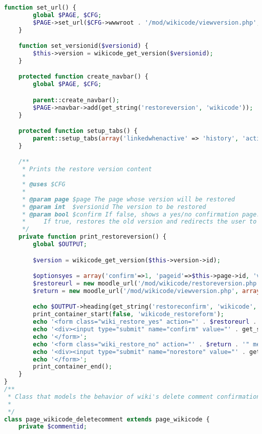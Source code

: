 \begin{lstlisting}[language=PHP]
    function set_url() {
        global $PAGE, $CFG;
        $PAGE->set_url($CFG->wwwroot . '/mod/wikicode/viewversion.php', array('pageid' => $this->page->id, 'versionid' => $this->version->id));
    }

    function set_versionid($versionid) {
        $this->version = wikicode_get_version($versionid);
    }

    protected function create_navbar() {
        global $PAGE, $CFG;

        parent::create_navbar();
        $PAGE->navbar->add(get_string('restoreversion', 'wikicode'));
    }

    protected function setup_tabs() {
        parent::setup_tabs(array('linkedwhenactive' => 'history', 'activetab' => 'history'));
    }

    /**
     * Prints the restore version content
     *
     * @uses $CFG
     *
     * @param page $page The page whose version will be restored
     * @param int  $versionid The version to be restored
     * @param bool $confirm If false, shows a yes/no confirmation page.
     *     If true, restores the old version and redirects the user to the 'view' tab.
     */
    private function print_restoreversion() {
        global $OUTPUT;

        $version = wikicode_get_version($this->version->id);

        $optionsyes = array('confirm'=>1, 'pageid'=>$this->page->id, 'versionid'=>$version->id, 'sesskey'=>sesskey());
        $restoreurl = new moodle_url('/mod/wikicode/restoreversion.php', $optionsyes);
        $return = new moodle_url('/mod/wikicode/viewversion.php', array('pageid'=>$this->page->id, 'versionid'=>$version->id));

        echo $OUTPUT->heading(get_string('restoreconfirm', 'wikicode', $version->version), 2);
        print_container_start(false, 'wikicode_restoreform');
        echo '<form class="wiki_restore_yes" action="' . $restoreurl . '" method="post" id="restoreversion">';
        echo '<div><input type="submit" name="confirm" value="' . get_string('yes') . '" /></div>';
        echo '</form>';
        echo '<form class="wiki_restore_no" action="' . $return . '" method="post">';
        echo '<div><input type="submit" name="norestore" value="' . get_string('no') . '" /></div>';
        echo '</form>';
        print_container_end();
    }
}
/**
 * Class that models the behavior of wiki's delete comment confirmation page
 *
 */
class page_wikicode_deletecomment extends page_wikicode {
    private $commentid;


\end{lstlisting}
